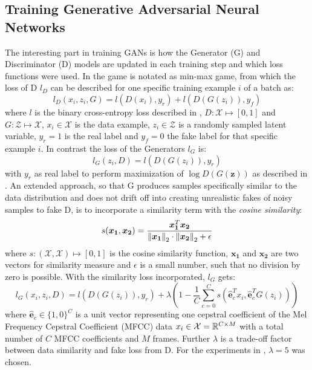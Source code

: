 \subsection{Training Generative Adversarial Neural Networks}
The interesting part in training GANs is how the Generator (G) and Discriminator (D) models are updated in each training step and which loss functions were used.
In  the game is notated as min-max game, from which the loss of D $l_D$ can be described for one specific training example $i$ of a batch as:
\begin{equation}
  l_D(x_i, z_i, G) = l(D(x_i), y_r) + l(D(G(z_i)), y_f)
\end{equation}
where $l$ is the binary cross-entropy loss described in , $D: \mathcal{X} \mapsto [0, 1]$ and $G: \mathcal{Z} \mapsto \mathcal{X}$, $x_i \in \mathcal{X}$ is the data example, $z_i \in \mathcal{Z}$ is a randomly sampled latent variable, $y_r = 1$ is the real label and $y_f = 0$ the fake label for that specific example $i$.
In contrast the loss of the Generators $l_G$ is:
\begin{equation}
  l_G(z_i, D) =  l(D(G(z_i)), y_r)
\end{equation}
with $y_r$ as real label to perform maximization of $\log D(G(\bm{z}))$ as described in .
An extended approach, so that G produces samples specifically similar to the data distribution and does not drift off into creating unrealistic fakes of noisy samples to fake D, is to incorporate a similarity term with the \emph{cosine similarity}:
\begin{equation}
  s(\bm{x_1}, \bm{x_2}) = \frac{\bm{x_1}^T \bm{x_2}}{\norm{\bm{x_1}}_2 \cdot \norm{\bm{x_2}}_2 + \epsilon} 
\end{equation}
where $s : (\mathcal{X}, \mathcal{X}) \mapsto [0, 1]$ is the cosine similarity function, $\bm{x_1}$ and $\bm{x_2}$ are two vectors for similarity measure and $\epsilon$ is a small number, such that no division by zero is possible.
With the similarity loss incorporated, $l_G$ gets:
\begin{equation}
  l_G(x_i, z_i, D) =  l(D(G(z_i)), y_r) + \lambda \left(1 - \frac{1}{C} \sum_{c=0}^{C} s(\hat{\bm{e}}_c^T x_i , \hat{\bm{e}}_c^T G(z_i)) \right)
\end{equation}
where $\hat{\bm{e}}_c \in \{1, 0\}^C$ is a unit vector representing one cepstral coefficient of the Mel Frequency Cepstral Coefficient (MFCC) data $x_i \in \mathcal{X} = \mathbb{R}^{C \times M}$ with a total number of $C$ MFCC coefficients and $M$ frames.
Further $\lambda$ is a trade-off factor between data similarity and fake loss from D.
For the experiments in , $\lambda = 5$ was chosen.

